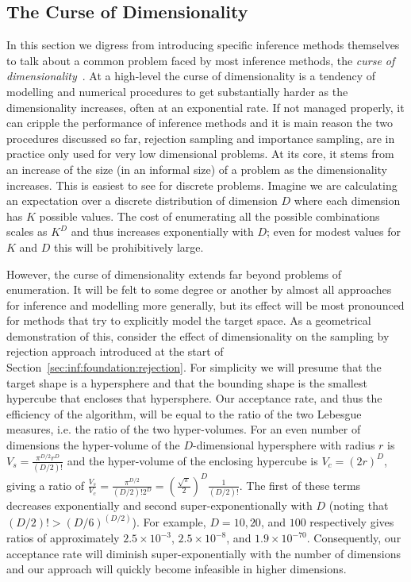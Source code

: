 
\subsection{The Curse of Dimensionality}
\label{sec:inf:foundation:curse}

In this section we digress from introducing specific inference methods themselves
to talk about a common problem faced by most inference methods, the
\emph{curse of dimensionality}~\citep{bellman1961adaptive}.  At a high-level the curse of 
dimensionality is a tendency
of modelling and numerical procedures to get substantially harder as the dimensionality increases, 
often at an exponential rate.  If not managed properly, it can cripple the performance of
inference methods and it is main reason the two procedures discussed so far, rejection
sampling and importance sampling, are in practice only used for very low dimensional problems.
At its core, it stems from an increase of the size (in an informal size) of a problem as the
dimensionality increases.  This is easiest to see for discrete problems.   Imagine we are calculating
an expectation over a discrete distribution of dimension $D$ where each dimension has $K$
possible values.  The cost of enumerating all the possible combinations scales as $K^D$ and thus
increases exponentially with $D$; even for modest values for $K$ and $D$ this will 
be prohibitively large.

However, the curse of dimensionality extends far beyond problems of enumeration.  It will be felt to
some degree or another by almost all approaches for inference and modelling more generally,
but its effect will be most pronounced for methods that try to explicitly model the target
space.  As a geometrical demonstration of this, consider the effect of dimensionality on 
the sampling by rejection approach introduced at the start of Section~\ref{sec:inf:foundation:rejection}.
For simplicity we will presume that the target shape is a hypersphere and that
the bounding shape is the smallest hypercube that encloses that hypersphere.  Our acceptance rate,
and thus the efficiency of the algorithm, will be equal to the ratio of the two Lebesgue 
measures, i.e. the ratio of the two hyper-volumes.  
For an even number of dimensions
the hyper-volume of the $D$-dimensional hypersphere with radius $r$ is $V_{s} = \frac{\pi^{D/2}r^D}{(D/2)!}$
and the hyper-volume of the enclosing hypercube is $V_c = (2r)^D$, giving a ratio of
$\frac{V_s}{V_c} = \frac{\pi^{D/2}}{(D/2)! 2^D} = \left(\frac{\sqrt{\pi}}{2}\right)^D\frac{1}{(D/2)!}$.
The first of these terms decreases exponentially and second
super-exponentionally with $D$ (noting that $(D/2)!>(D/6)^{(D/2)}$).  
For example, $D=10, 20$, and $100$ respectively gives ratios of approximately
$2.5 \times 10^{-3}$, $2.5 \times 10^{-8}$, and $1.9\times 10^{-70}$.  
Consequently, our acceptance rate will diminish
super-exponentially with the number of dimensions and our approach will quickly become
infeasible in higher dimensions.

